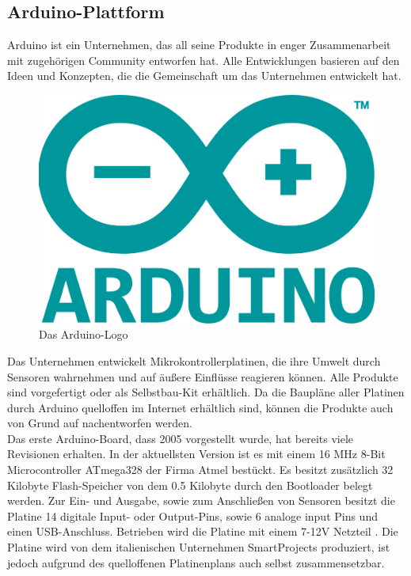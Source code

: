 \subsection{Arduino-Plattform}\label{ss:Arduino}

Arduino ist ein Unternehmen, das all seine Produkte in enger Zusammenarbeit mit zugehörigen Community entworfen hat. Alle Entwicklungen basieren auf den Ideen und Konzepten, die die Gemeinschaft um das Unternehmen entwickelt hat. 

\begin{figure}[H] 
	\centering
	\includegraphics[scale=0.2]{Bilder/arduino}
	\caption{Das Arduino-Logo\cite{i:arduino}}
	\label{f:tree}
\end{figure}

Das Unternehmen entwickelt Mikrokontrollerplatinen, die ihre Umwelt durch Sensoren wahrnehmen und auf äußere Einflüsse reagieren können. Alle Produkte sind vorgefertigt oder als Selbstbau-Kit erhältlich. Da die Baupläne aller Platinen durch Arduino quelloffen im Internet erhältlich sind, können die Produkte auch von Grund auf nachentworfen werden.\\

Das erste Arduino-Board, dass 2005 vorgestellt wurde, hat bereits viele Revisionen erhalten. In der aktuellsten Version ist es mit einem 16 \ac{MHz} 8-Bit Microcontroller ATmega328 der Firma Atmel bestückt. Es besitzt zusätzlich 32 Kilobyte Flash-Speicher von dem 0.5 Kilobyte durch den Bootloader belegt werden. Zur Ein- und Ausgabe, sowie zum Anschließen von Sensoren besitzt die Platine 14 digitale Input- oder Output-Pins, sowie 6 analoge input Pins und einen \ac{USB}-Anschluss. Betrieben wird die Platine mit einem 7-12V Netzteil \cite{ws:arduinouno}.
Die Platine wird von dem italienischen Unternehmen SmartProjects produziert, ist jedoch aufgrund des quelloffenen Platinenplans auch selbst zusammensetzbar.\\

